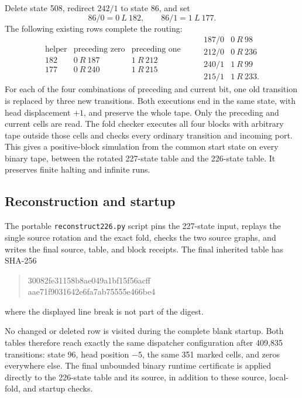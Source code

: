 Delete state 508, redirect $242/1$ to state 86, and set
\[
 86/0=0\ L\ 182,\qquad 86/1=1\ L\ 177.
\]
The following existing rows complete the routing:
\[
\begin{array}{c|cc}
\text{helper}&\text{preceding zero}&\text{preceding one}\\\hline
182&0\ R\ 187&1\ R\ 212\\
177&0\ R\ 240&1\ R\ 215
\end{array}
\qquad
\begin{array}{c|c}
187/0&0\ R\ 98\\
212/0&0\ R\ 236\\
240/1&1\ R\ 99\\
215/1&1\ R\ 233.
\end{array}
\]
For each of the four combinations of preceding and current bit, one
old transition is replaced by three new transitions.  Both executions
end in the same state, with head displacement $+1$, and preserve the
whole tape.  Only the preceding and current cells are read.  The fold
checker executes all four blocks with arbitrary tape outside those
cells and checks every ordinary transition and incoming port.  This
gives a positive-block simulation from the common start state on every
binary tape, between the rotated 227-state table and the 226-state
table.  It preserves finite halting and infinite runs.

\subsection{Reconstruction and startup}

The portable \texttt{reconstruct226.py} script pins the 227-state input,
replays the single source rotation and the exact fold, checks the two
source graphs, and writes the final source, table, and block receipts.
The final inherited table has SHA-256
\begin{quote}\small\ttfamily
30082fe31158b8ae049a1bf15f56acff\\
aae71f9031642e6fa7ab75555e466be4
\end{quote}
where the displayed line break is not part of the digest.

No changed or deleted row is visited during the complete blank startup.
Both tables therefore reach exactly the same dispatcher configuration
after 409,835 transitions: state 96, head position $-5$, the same 351
marked cells, and zeros everywhere else.  The final unbounded binary
runtime certificate is applied directly to the 226-state table and its
source, in addition to these source, local-fold, and startup checks.
